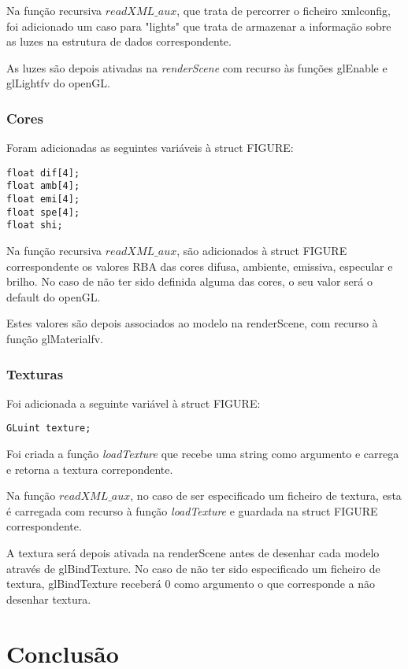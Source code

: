 \documentclass[11pt,a4paper]{report}
\begin{document}
Na função recursiva {$readXML\_aux$}, que trata de percorrer o ficheiro xmlconfig, foi adicionado um caso para "lights" que trata de armazenar a informação sobre as luzes na estrutura de dados correspondente.

As luzes são depois ativadas na \emph{renderScene} com recurso às funções glEnable e glLightfv do openGL.

\subsection{Cores}
Foram adicionadas as seguintes variáveis à struct FIGURE:
\begin{lstlisting}[style = code]
float dif[4];
float amb[4];
float emi[4];
float spe[4];
float shi;
\end{lstlisting}

Na função recursiva {$readXML\_aux$}, são adicionados à struct FIGURE correspondente os valores RBA das cores difusa, ambiente, emissiva, especular e brilho.
No caso de não ter sido definida alguma das cores, o seu valor será o default do openGL.

Estes valores são depois associados ao modelo na renderScene, com recurso à função glMaterialfv.

\subsection{Texturas}
Foi adicionada a seguinte variável à struct FIGURE:

\begin{lstlisting}[style = code]
GLuint texture;
\end{lstlisting}

Foi criada a função \emph{loadTexture} que recebe uma string como argumento e carrega e retorna a textura correpondente.

Na função {$readXML\_aux$}, no caso de ser especificado um ficheiro de textura, esta é carregada com recurso à função \emph{loadTexture} e guardada na struct FIGURE correspondente.

A textura será depois ativada na renderScene antes de desenhar cada modelo através de glBindTexture. No caso de não ter sido especificado um ficheiro de textura, glBindTexture receberá 0 como argumento o que corresponde a não desenhar textura.


\chapter{Conclusão}
\end{document}
